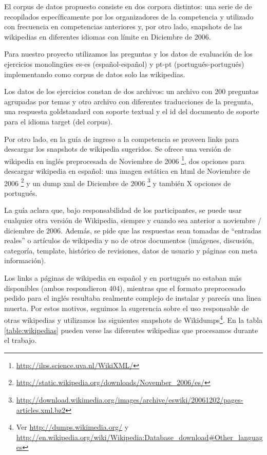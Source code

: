 El corpus de datos propuesto consiste en dos corpora distintos: una serie de de recopilados específicamente por los organizadores de la competencia y utilizado con frecuencia en competencias anteriores y, por otro lado, snapshots de las wikipedias en diferentes idiomas con límite en Diciembre de 2006.

Para nuestro proyecto utilizamos las preguntas y los datos de evaluación de los ejercicios monolingües es-es (español-español) y pt-pt (portugués-portugués) implementando como corpus de datos solo las wikipedias.

Los datos de los ejercicios constan de dos archivos: un archivo con 200 preguntas agrupadas por temas y otro archivo con diferentes traducciones de la pregunta, una respuesta goldstandard con soporte textual y el id del documento de soporte para el idioma target (del corpus).

Por otro lado, en la guía de ingreso a la competencia\cite{GuidelineClef07} se proveen links para descargar los snapshots de wikipedia sugeridos. Se ofrece una versión de wikipedia en inglés preprocesada de Noviembre de 2006 \footnote{\url{http://ilps.science.uva.nl/WikiXML/}}, dos opciones para descargar wikipedia en español: una imagen estática en html de Noviembre de 2006 \footnote{\url{http://static.wikipedia.org/downloads/November_2006/es/}} y un dump xml de Diciembre de 2006 \footnote{\url{http://download.wikimedia.org/images/archive/eswiki/20061202/pages-articles.xml.bz2}} y también X opciones de portugués.

La guía aclara que, bajo responsabilidad de los participantes, se puede usar
cualquier otra versión de Wikipedia, siempre y cuando sea anterior a noviembre / diciembre de 2006.
Además, se pide que las respuestas sean tomadas de ``entradas reales'' o artículos de wikipedia y
no de otros documentos (imágenes, discusión, categoría, template, histórico de revisiones, datos de usuario y páginas con meta información).

Los links a páginas de wikipedia en español y en portugués no estaban más disponibles (ambos respondieron 404), mientras que el formato preprocesado pedido para el inglés resultaba realmente complejo de instalar y parecía una linea muerta. Por estos motivos, seguimos la sugerencia sobre el uso responsable de otras wikipedias y utilizamos las siguientes snapshots de Wikidumps\footnote{Ver \url{http://dumps.wikimedia.org/} y \url{http://en.wikipedia.org/wiki/Wikipedia:Database_download\#Other_languages}}. En la tabla \ref{table:wikipedias} pueden verse las diferentes wikipedias que procesamos durante el trabajo.

